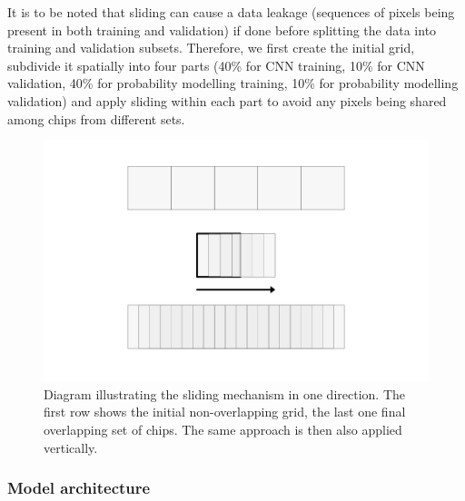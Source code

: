 It is to be noted that sliding can cause a data leakage (sequences of pixels being
present in both training and validation) if done before splitting the data into
training and validation subsets. Therefore, we first create the initial grid, subdivide
it spatially into four parts (40\% for CNN training, 10\% for CNN validation, 40\% for
probability modelling training, 10\% for probability modelling validation) and apply
sliding within each part to avoid any pixels being shared among chips from different
sets.

\begin{figure}
    \centering
    \includegraphics[width=.8\linewidth]{fig/sliding.png}
    \caption{Diagram illustrating the sliding mechanism in one direction. The first row shows the initial non-overlapping grid, the last one final overlapping set of chips. The same approach is then also applied vertically.}
    \label{fig:sliding}
\end{figure}


\subsubsection{Model architecture}



